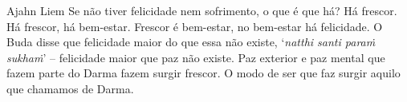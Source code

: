 
\begin{quotepage}{0.56\linewidth}{Ajahn Liem}
Se não tiver felicidade nem sofrimento, o que é que há? Há frescor. Há
frescor, há bem-estar. Frescor é bem-estar, no bem-estar há felicidade.
O Buda disse que felicidade maior do que essa não existe,
‘\emph{natthi santi paraṁ sukhaṁ}’ – felicidade maior que
paz não existe. Paz exterior e paz mental que fazem parte do Darma
fazem surgir frescor. O modo de ser que faz surgir aquilo que chamamos de Darma.
\end{quotepage}

